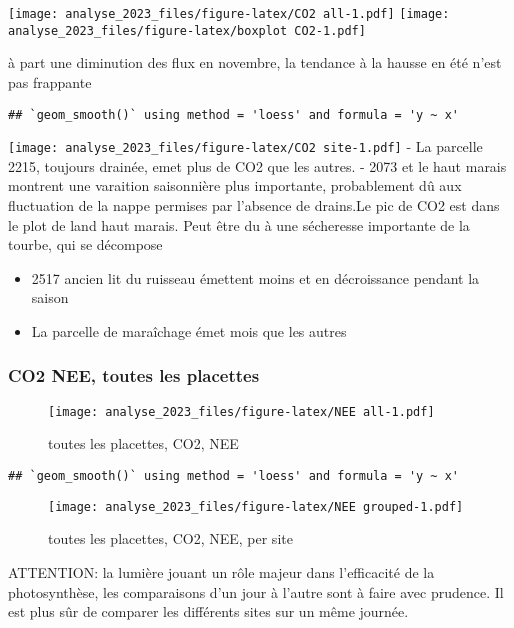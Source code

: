 \documentclass[
]{article}
\begin{document}
\texttt{[image: analyse\_2023\_files/figure-latex/CO2 all-1.pdf]}
\texttt{[image: analyse\_2023\_files/figure-latex/boxplot CO2-1.pdf]}

à part une diminution des flux en novembre, la tendance à la hausse en
été n'est pas frappante

\begin{verbatim}
## `geom_smooth()` using method = 'loess' and formula = 'y ~ x'
\end{verbatim}

\texttt{[image: analyse\_2023\_files/figure-latex/CO2 site-1.pdf]} - La
parcelle 2215, toujours drainée, emet plus de CO2 que les autres. - 2073
et le haut marais montrent une varaition saisonnière plus importante,
probablement dû aux fluctuation de la nappe permises par l'absence de
drains.Le pic de CO2 est dans le plot de land haut marais. Peut être du
à une sécheresse importante de la tourbe, qui se décompose

\begin{itemize}
\item
  2517 ancien lit du ruisseau émettent moins et en décroissance pendant
  la saison
\item
  La parcelle de maraîchage émet mois que les autres
\end{itemize}

\hypertarget{co2-nee-toutes-les-placettes}{%
\subsubsection{CO2 NEE, toutes les
placettes}\label{co2-nee-toutes-les-placettes}}

\begin{figure}
\centering
\texttt{[image: analyse\_2023\_files/figure-latex/NEE all-1.pdf]}
\caption{toutes les placettes, CO2, NEE}
\end{figure}

\begin{verbatim}
## `geom_smooth()` using method = 'loess' and formula = 'y ~ x'
\end{verbatim}

\begin{figure}
\centering
\texttt{[image: analyse\_2023\_files/figure-latex/NEE grouped-1.pdf]}
\caption{toutes les placettes, CO2, NEE, per site}
\end{figure}

ATTENTION: la lumière jouant un rôle majeur dans l'efficacité de la
photosynthèse, les comparaisons d'un jour à l'autre sont à faire avec
prudence. Il est plus sûr de comparer les différents sites sur un même
journée.
\end{document}
